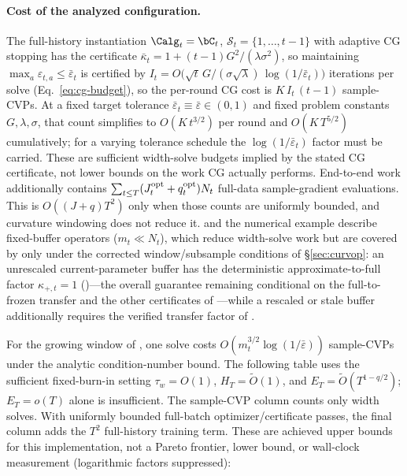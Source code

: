 \paragraph{Cost of the analyzed configuration.}
The full-history instantiation $\Calg_t=\bC_t$,
$\mathcal{S}_t=\{1,\dots,t-1\}$ with adaptive CG stopping has
the certificate $\bar\kappa_t = 1+(t-1)G^2/(\lambda\sigma^2)$, so maintaining
$\max_a\varepsilon_{t,a}\le\bar\varepsilon_t$ is certified by
$I_t = O\bigl(\sqrt{t}\,G/(\sigma\sqrt{\lambda})\,
\log(1/\bar\varepsilon_t)\bigr)$ iterations per solve (Eq.~\eqref{eq:cg-budget}),
so the per-round CG cost is $K\,I_t\,(t-1)$ sample-CVPs.  At a fixed target
tolerance $\bar\varepsilon_t\equiv\bar\varepsilon\in(0,1)$ and fixed problem
constants $G,\lambda,\sigma$, that count simplifies to $O(K\,t^{3/2})$ per round
and $O(K\,T^{5/2})$ cumulatively; for a varying tolerance schedule the
$\log(1/\bar\varepsilon_t)$ factor must be carried.  These are sufficient
width-solve budgets implied by the stated CG certificate, not lower bounds on
the work CG actually performs.  End-to-end work additionally contains
$\sum_{t\le T}(J_t^{\rm opt}+q_t^{\rm opt})N_t$ full-data sample-gradient
evaluations.  This is $O((J+q)T^2)$ only when those counts are uniformly
bounded, and curvature windowing does not reduce it.
 and the numerical example describe fixed-buffer operators
($m_t\ll N_t$), which reduce width-solve work but are covered by
 only under the corrected window/subsample conditions of
\S\ref{sec:curvop}: an unrescaled current-parameter buffer has the deterministic
approximate-to-full factor $\kappa_{+,t}{=}1$ ()---the overall
guarantee remaining conditional on the full-to-frozen transfer and the other
certificates of ---while a rescaled or stale buffer additionally
requires the verified transfer factor of .

For the growing window of , one solve costs
$O(m_t^{3/2}\log(1/\bar\varepsilon))$ sample-CVPs under the analytic
condition-number bound.  The following table uses the sufficient fixed-burn-in
setting $\tau_w=O(1)$, $H_T=\widetilde O(1)$, and
$E_T=\widetilde O(T^{1-q/2})$; $E_T=o(T)$ alone is insufficient.  The
sample-CVP column counts only width solves.  With uniformly bounded full-batch
optimizer/certificate passes, the final column adds the $T^2$ full-history
training term.  These are achieved upper bounds for this implementation, not a
Pareto frontier, lower bound, or wall-clock measurement (logarithmic factors
suppressed):


